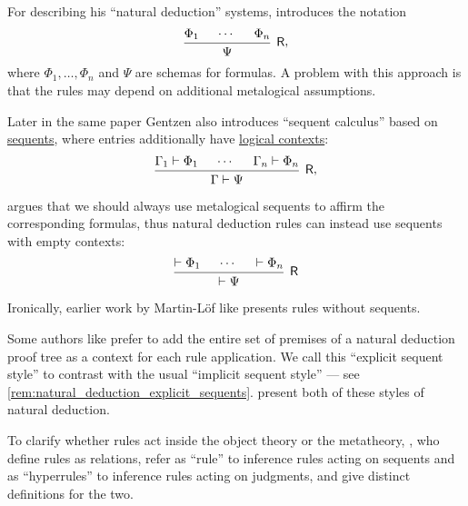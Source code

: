 \begin{remark}
  For describing his \enquote{natural deduction} systems,  introduces the notation
  \begin{equation*}
    \begin{prooftree}
      \hypo{ \Phi_1 }
      \hypo{ \cdots }
      \hypo{ \Phi_n }
      \infer3[\logic{R}]{ \Psi }
    \end{prooftree},
  \end{equation*}
  where \( \Phi_1, \ldots, \Phi_n \) and \( \Psi \) are schemas for formulas. A problem with this approach is that the rules may depend on additional metalogical assumptions.

  Later in the same paper Gentzen also introduces \enquote{sequent calculus} based on \hyperref[def:sequent]{sequents}, where entries additionally have \hyperref[def:logical_context]{logical contexts}:
  \begin{equation*}
    \begin{prooftree}
      \hypo{ \Gamma_1 \vdash \Phi_1 }
      \hypo{ \cdots }
      \hypo{ \Gamma_n \vdash \Phi_n }
      \infer3[\logic{R}]{ \Gamma \vdash \Psi }
    \end{prooftree},
  \end{equation*}

   argues that we should always use metalogical sequents to affirm the corresponding formulas, thus natural deduction rules can instead use sequents with empty contexts:
  \begin{equation*}
    \begin{prooftree}
      \hypo{ \vdash \Phi_1 }
      \hypo{ \cdots }
      \hypo{ \vdash \Phi_n }
      \infer3[\logic{R}]{ \vdash \Psi }
    \end{prooftree}
  \end{equation*}

  Ironically, earlier work by Martin-L\"of like \cite{MartinLöf1984IntuitionisticTypeTheory} presents rules without sequents.

  Some authors like  prefer to add the entire set of premises of a natural deduction proof tree as a context for each rule application. We call this \enquote{explicit sequent style} to contrast with the usual \enquote{implicit sequent style} --- see \cref{rem:natural_deduction_explicit_sequents}.  present both of these styles of natural deduction.

  To clarify whether rules act inside the object theory or the metatheory, , who define rules as relations, refer as \enquote{rule} to inference rules acting on sequents and as \enquote{hyperrules} to inference rules acting on judgments, and give distinct definitions for the two.
\end{remark}

